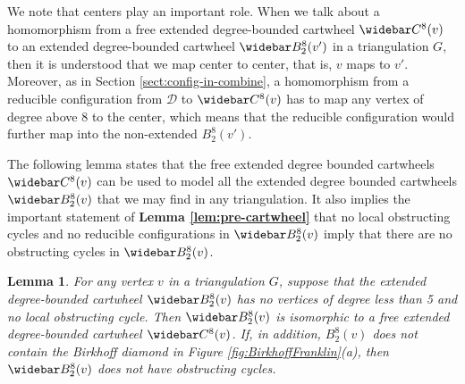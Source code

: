 \documentclass[10pt,a4paper]{article}
\newtheorem{lem}[thm]{Lemma}
\renewcommand{\bar}{\widebar}
\def\cD{{\mathcal D}}
\def\showlabel#1{}
\begin{document}
We note that centers play an important role. When we talk about a homomorphism from a free extended degree-bounded cartwheel $\bar C^8(v)$ to an extended degree-bounded cartwheel $\bar B^8_2(v')$ in a triangulation $G$, then it is understood that we map center to center, that is, $v$ maps to $v'$. Moreover, as in Section \ref{sect:config-in-combine}, a homomorphism
from a reducible configuration from $\cD$ to $\bar C^8(v)$ has to map any vertex of degree above 8 to the center, which means that the reducible configuration would further map into the non-extended $B^8_2(v')$.

The following lemma states that the free extended degree bounded cartwheels $\bar C^8(v)$ can be used to model all the extended degree bounded cartwheels $\bar B_2^8(v)$ that we may find in any triangulation. It also implies the important statement of {\bf  Lemma \ref{lem:pre-cartwheel}} that no local obstructing cycles and no reducible configurations in $\bar B_2^8(v)$ imply that there are no obstructing cycles in $\bar B_2^8(v)$.

\begin{lem}\label{lem:cartwheel}\showlabel{lem:cartwheel}
For any vertex $v$ in a triangulation $G$, suppose that the extended degree-bounded cartwheel $\bar B^8_2(v)$ has no vertices of degree less than 5 and no local obstructing cycle. Then $\bar B^8_2(v)$ is isomorphic to a free extended degree-bounded cartwheel $\bar C^8(v)$. 
If, in addition, $B^8_2(v)$ does not contain the Birkhoff diamond in Figure \ref{fig:BirkhoffFranklin}(a), then $\bar B^8_2(v)$ does not have obstructing cycles.
\end{lem}
\end{document}
